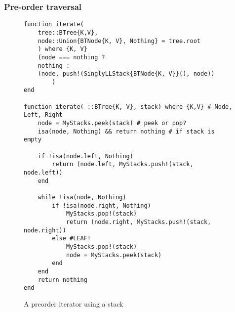 \documentclass[a4paper, 11pt]{article}
\begin{document}

    \clearpage
    \subsubsection*{Pre-order traversal}
    \begin{figure}[H]
        \centering
    \begin{verbatim}
function iterate(
    tree::BTree{K,V}, 
    node::Union{BTNode{K, V}, Nothing} = tree.root
    ) where {K, V}
    (node === nothing ? 
    nothing : 
    (node, push!(SinglyLLStack{BTNode{K, V}}(), node))
        )
end

function iterate(_::BTree{K, V}, stack) where {K,V} # Node, Left, Right
    node = MyStacks.peek(stack) # peek or pop? 
    isa(node, Nothing) && return nothing # if stack is empty

    if !isa(node.left, Nothing) 
        return (node.left, MyStacks.push!(stack, node.left))
    end

    while !isa(node, Nothing) 
        if !isa(node.right, Nothing)
            MyStacks.pop!(stack)
            return (node.right, MyStacks.push!(stack, node.right))
        else #LEAF!
            MyStacks.pop!(stack)
            node = MyStacks.peek(stack)
        end
    end
    return nothing
end
    \end{verbatim}
    \caption{A preorder iterator using a stack}
    \label{code:preorderiterator}
    \end{figure}





\end{document}
